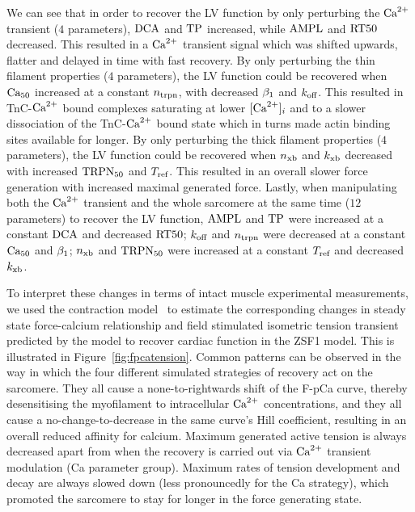 \vspace{0.2cm}
We can see that in order to recover the LV function by only perturbing the $\textrm{Ca}^{2+}$ transient ($4$ parameters), $\textrm{DCA}$ and $\textrm{TP}$ increased, while $\textrm{AMPL}$ and $\textrm{RT50}$ decreased. This resulted in a $\textrm{Ca}^{2+}$ transient signal which was shifted upwards, flatter and delayed in time with fast recovery. By only perturbing the thin filament properties ($4$ parameters), the LV function could be recovered when $\textrm{Ca}_{50}$ increased at a constant $n_{\textrm{trpn}}$, with decreased $\beta_1$ and $k_{\textrm{off}}$. This resulted in TnC-$\textrm{Ca}^{2+}$ bound complexes saturating at lower $[\textrm{Ca}^{2+}]_{i}$ and to a slower dissociation of the TnC-$\textrm{Ca}^{2+}$ bound state which in turns made actin binding sites available for longer. By only perturbing the thick filament properties ($4$ parameters), the LV function could be recovered when $n_{\textrm{xb}}$ and $k_{\textrm{xb}}$ decreased with increased $\textrm{TRPN}_{50}$ and $T_{\textrm{ref}}$. This resulted in an overall slower force generation with increased maximal generated force. Lastly, when manipulating both the $\textrm{Ca}^{2+}$ transient and the whole sarcomere at the same time ($12$ parameters) to recover the LV function, $\textrm{AMPL}$ and $\textrm{TP}$ were increased at a constant $\textrm{DCA}$ and decreased $\textrm{RT50}$; $k_{\textrm{off}}$ and $n_{\textrm{trpn}}$ were decreased at a constant $\textrm{Ca}_{50}$ and $\beta_1$; $n_{\textrm{xb}}$ and $\textrm{TRPN}_{50}$ were increased at a constant $T_{\textrm{ref}}$ and decreased $k_{\textrm{xb}}$.

\vspace{0.2cm}
To interpret these changes in terms of intact muscle experimental measurements, we used the contraction model~\cite{Land:2012*a} to estimate the corresponding changes in steady state force-calcium relationship and field stimulated isometric tension transient predicted by the model to recover cardiac function in the ZSF1 model. This is illustrated in Figure~\ref{fig:fpcatension}. Common patterns can be observed in the way in which the four different simulated strategies of recovery act on the sarcomere. They all cause a none-to-rightwards shift of the F-pCa curve, thereby desensitising the myofilament to intracellular $\textrm{Ca}^{2+}$ concentrations, and they all cause a no-change-to-decrease in the same curve's Hill coefficient, resulting in an overall reduced affinity for calcium. Maximum generated active tension is always decreased apart from when the recovery is carried out via $\textrm{Ca}^{2+}$ transient modulation (Ca parameter group). Maximum rates of tension development and decay are always slowed down (less pronouncedly for the Ca strategy), which promoted the sarcomere to stay for longer in the force generating state.

